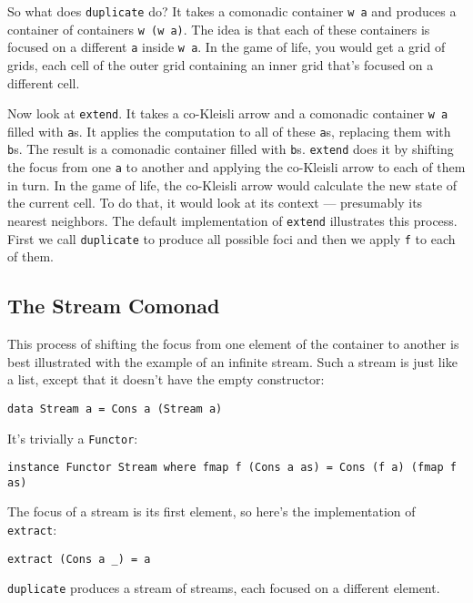 So what does \texttt{duplicate} do? It takes a comonadic container
\texttt{w\ a} and produces a container of containers \texttt{w\ (w\ a)}.
The idea is that each of these containers is focused on a different
\texttt{a} inside \texttt{w\ a}. In the game of life, you would get a
grid of grids, each cell of the outer grid containing an inner grid
that's focused on a different cell.

Now look at \texttt{extend}. It takes a co-Kleisli arrow and a comonadic
container \texttt{w\ a} filled with \texttt{a}s. It applies the
computation to all of these \texttt{a}s, replacing them with
\texttt{b}s. The result is a comonadic container filled with
\texttt{b}s. \texttt{extend} does it by shifting the focus from one
\texttt{a} to another and applying the co-Kleisli arrow to each of them
in turn. In the game of life, the co-Kleisli arrow would calculate the
new state of the current cell. To do that, it would look at its context
--- presumably its nearest neighbors. The default implementation of
\texttt{extend} illustrates this process. First we call
\texttt{duplicate} to produce all possible foci and then we apply
\texttt{f} to each of them.

\subsection{The Stream Comonad}\label{the-stream-comonad}

This process of shifting the focus from one element of the container to
another is best illustrated with the example of an infinite stream. Such
a stream is just like a list, except that it doesn't have the empty
constructor:

\begin{verbatim}
data Stream a = Cons a (Stream a)
\end{verbatim}

It's trivially a \texttt{Functor}:

\begin{verbatim}
instance Functor Stream where fmap f (Cons a as) = Cons (f a) (fmap f as)
\end{verbatim}

The focus of a stream is its first element, so here's the implementation
of \texttt{extract}:

\begin{verbatim}
extract (Cons a _) = a
\end{verbatim}

\texttt{duplicate} produces a stream of streams, each focused on a
different element.

